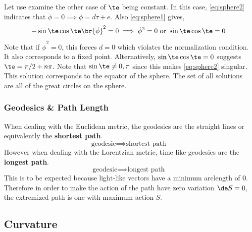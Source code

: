 \documentclass{article}
\begin{document}
Let use examine the other case of $\te$ being constant. In this case, \eqref{eq:sphere2} indicates that $\ddot{\phi}= 0 \implies \phi = d \tau + e$. Also \eqref{eq:sphere1} gives,
\[ -\sin\te \cos\te \br{\dot{\phi}}^2 = 0 \implies \dot{\phi}^2 = 0  \text{ or } \sin\te\cos\te = 0 \]
Note that if $\dot{\phi}^2 = 0$, this forces $d=0$ which violates the normalization condition. It also corresponds to a fixed point. Alternatively, $\sin\te\cos\te = 0$ suggests $\te = \pi / 2 + n\pi$. Note that $\sin \te \neq 0, \pi$ since this makes \eqref{eq:sphere2} singular. This solution corresponds to the equator of the sphere. The set of all solutions are all of the great circles on the sphere.

\subsubsection{Geodesics \& Path Length}

When dealing with the Euclidean metric, the geodesics are the straight lines or equivalently the \textbf{shortest path}.
\[ \text{geodesic} \implies \text{shortest path} \]
However when dealing with the Lorentzian metric, time like geodesics are the \textbf{longest path}.
\[ \text{geodesic} \implies \text{longest path} \]
This is to be expected because light-like vectors have a minimum arclength of $0$. Therefore in order to make the action of the path have zero variation $\de S = 0$, the extremized path is one with maximum action $S$.

\subsection{Curvature}
\end{document}
